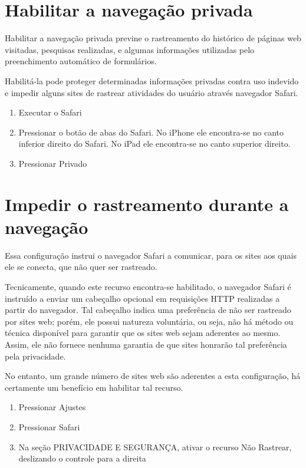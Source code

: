 \section{Habilitar a navega\c c\~ao privada}

Habilitar a navega\c c\~ao privada previne o rastreamento do hist\'orico de páginas web visitadas, pesquisas realizadas, e algumas informa\c c\~oes utilizadas pelo preenchimento autom\'atico de formul\'arios.

Habilit\'a-la pode proteger determinadas informa\c c\~oes privadas contra uso indevido e impedir alguns sites de rastrear atividades do usu\'ario atrav\'es navegador Safari.

\begin{enumerate}
\item Executar o Safari
\item Pressionar o bot\~ao de abas do Safari. No iPhone ele encontra-se no canto inferior direito do Safari. No iPad ele encontra-se no canto superior direito. 
\item Pressionar Privado
\end{enumerate}

\section{Impedir o rastreamento durante a navega\c c\~ao}

Essa configura\c c\~ao instrui o navegador Safari a comunicar, para os sites aos quais ele se conecta, que n\~ao quer ser rastreado.

Tecnicamente, quando este recurso encontra-se habilitado, o navegador Safari \'e instru\'ido a enviar um cabe\c calho opcional em requisi\c c\~oes HTTP realizadas a partir do navegador. Tal cabe\c calho indica uma prefer\^encia de n\~ao ser rastreado por sites web; por\'em, ele possui natureza volunt\'aria, ou seja, n\~ao h\'a m\'etodo ou t\'ecnica dispon\'ivel para garantir que os sites web sejam aderentes ao mesmo. Assim, ele n\~ao fornece nenhuma garantia de que sites honrar\~ao tal prefer\^encia pela privacidade. 

No entanto, um grande n\'umero de sites web s\~ao aderentes a esta configura\c c\~ao, h\'a certamente um benef\'icio em habilitar tal recurso.

\begin{enumerate}
\item Pressionar Ajustes
\item Pressionar Safari
\item Na se\c c\~ao PRIVACIDADE E SEGURAN\c CA, ativar o recurso N\~ao Rastrear, deslizando o controle para a direita
\end{enumerate}
